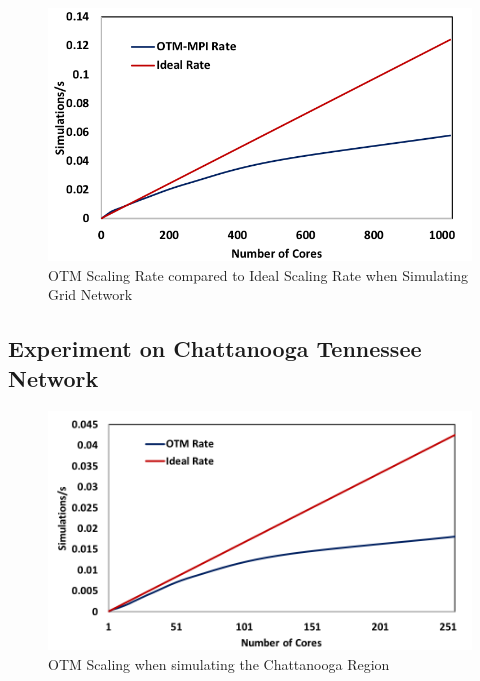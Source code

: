 \begin{figure}[ht]
    \centering
    \includegraphics[width=\columnwidth]{figs/Scaling.png}
    \caption{OTM Scaling Rate compared to Ideal Scaling Rate when Simulating Grid Network}
    \label{fig:scaling}
\end{figure}

\subsection{Experiment on Chattanooga Tennessee Network}

\begin{figure}[ht]
    \centering
    \includegraphics[width=\columnwidth]{figs/Chattanooga_Rate.png}
    \caption{OTM Scaling when simulating the Chattanooga Region}
    \label{fig:ChattanoogaRate}
\end{figure}

